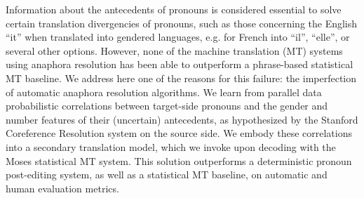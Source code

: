 Information about the antecedents of pronouns is considered essential to solve certain translation divergencies of pronouns, such as those concerning the English ``it'' when translated into gendered languages, e.g. for French into ``il'', ``elle'', or several other options.  However, none of the machine translation (MT) systems using anaphora resolution has been able to outperform a phrase-based statistical MT baseline.  We address here one of the reasons for this failure: the imperfection of automatic anaphora resolution algorithms.  We learn from parallel data probabilistic correlations between target-side pronouns and the gender and number features of their (uncertain) antecedents, as hypothesized by the Stanford Coreference Resolution system on the source side.  We embody these correlations into a secondary translation model, which we invoke upon decoding with the Moses statistical MT system.  This solution outperforms a deterministic pronoun post-editing system, as well as a statistical MT baseline, on automatic and human evaluation metrics.
